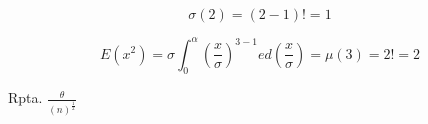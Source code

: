\documentclass[10pt,a4paper]{article}
\begin{document}
\begin{justify}
	\[  \]  \[  \sigma  \left( 2 \right) = \left( 2-1 \right) !=1 \] 
\end{justify}\par

\begin{justify}
	\[  \]  \[ E \left( x^{2} \right) = \sigma  \int _{0}^{ \alpha } \left( \frac{x}{ \sigma } \right) ^{3-1}ed \left( \frac{x}{ \sigma } \right) = \mu  \left( 3 \right) =2!=2 \] 
\end{justify}\par

\begin{justify}
	Rpta.  \( \frac{ \theta }{ \left( n \right) ^{\frac{1}{2}}} \) 
\end{justify}\par


\vspace{\baselineskip}
\vspace{\baselineskip}
\end{document}
